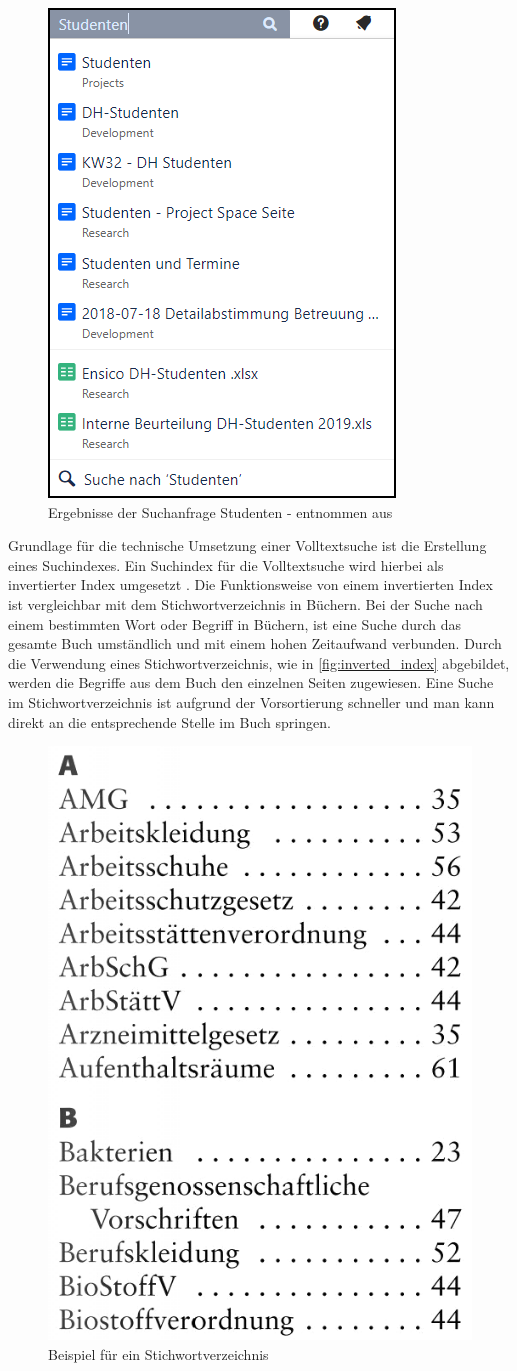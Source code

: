 \begin{figure}[H]
    \centering
    \includegraphics[width=0.4\linewidth]{images/Suchleiste_Confluence.png}
    \caption{Ergebnisse der Suchanfrage \glqq Studenten\grqq{} - entnommen aus \cite{EniscobyForcamGmbH.2021}\protect\footnotemark}
    \label{fig:search_confluence_fulltextsearch}
\end{figure}


Grundlage für die technische Umsetzung einer Volltextsuche ist die Erstellung eines Suchindexes. Ein Suchindex für die Volltextsuche wird hierbei als invertierter Index umgesetzt \cite{SebastianRuss.2017}. Die Funktionsweise von einem invertierten Index ist vergleichbar mit dem Stichwortverzeichnis in Büchern. Bei der Suche nach einem bestimmten Wort oder Begriff in Büchern, ist eine Suche durch das gesamte Buch umständlich und mit einem hohen Zeitaufwand verbunden. Durch die Verwendung eines Stichwortverzeichnis, wie in \autoref{fig:inverted_index} abgebildet, werden die Begriffe aus dem Buch den einzelnen Seiten zugewiesen. Eine Suche im Stichwortverzeichnis ist aufgrund der Vorsortierung schneller und man kann direkt an die entsprechende Stelle im Buch springen.

\begin{figure}[H]
    \centering
    \includegraphics[width=0.3\linewidth]{images/Stichwortverzeichnis.png}
    \caption{Beispiel für ein Stichwortverzeichnis \cite{weka.de.2014}}
    \label{fig:inverted_index}
\end{figure}

